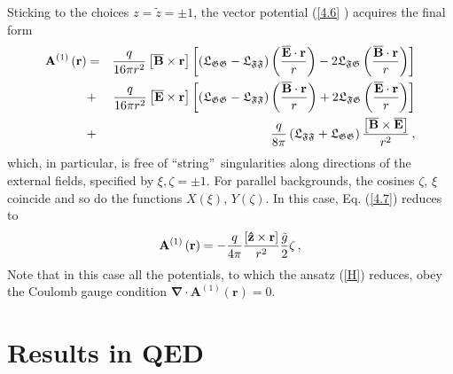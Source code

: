 \documentclass[12pt]{article}
\begin{document}
Sticking to the choices $z=\tilde{z}=\pm 1$, the vector potential (\ref{4.6}%
) acquires the final form%
\begin{eqnarray}
\mathbf{A}^{\left( 1\right) }\left( \mathbf{r}\right)  &=&\frac{q}{16\pi
r^{2}}\left[ \overline{\mathbf{B}}\times \mathbf{r}\right] \left[ \left( 
\mathfrak{L}_{\mathfrak{GG}}-\mathfrak{L}_{\mathfrak{FF}}\right) \left( 
\frac{\overline{\mathbf{E}}\cdot \mathbf{r}}{r}\right) -2\mathfrak{L}_{%
\mathfrak{FG}}\left( \frac{\overline{\mathbf{B}}\cdot \mathbf{r}}{r}\right) %
\right]   \notag \\
&+&\frac{q}{16\pi r^{2}}\left[ \overline{\mathbf{E}}\times \mathbf{r}\right] %
\left[ \left( \mathfrak{L}_{\mathfrak{GG}}-\mathfrak{L}_{\mathfrak{FF}%
}\right) \left( \frac{\overline{\mathbf{B}}\cdot \mathbf{r}}{r}\right) +2%
\mathfrak{L}_{\mathfrak{FG}}\left( \frac{\overline{\mathbf{E}}\cdot \mathbf{r%
}}{r}\right) \right]   \notag \\
&+&\frac{q}{8\pi }\left( \mathfrak{L}_{\mathfrak{FF}}+\mathfrak{L}_{%
\mathfrak{GG}}\right) \frac{\left[ \overline{\mathbf{B}}\times \overline{%
\mathbf{E}}\right] }{r^{2}}\,,  \label{4.7}
\end{eqnarray}%
which, in particular, is free of \textquotedblleft string\textquotedblright\
singularities along directions of the external fields, specified by $\xi
,\zeta =\pm 1$. For parallel backgrounds, the cosines $\zeta $, $\xi $
coincide and so do the functions $X\left( \xi \right) $, $Y\left( \zeta
\right) $. In this case, Eq. (\ref{4.7}) reduces to%
\begin{equation}
\mathbf{A}^{\left( 1\right) }\left( \mathbf{r}\right) =-\frac{q}{4\pi }\frac{%
\left[ \mathbf{\hat{z}}\times \mathbf{r}\right] }{r^{2}}\frac{\tilde{g}}{2}%
\zeta \,,  \label{4.12}
\end{equation}%
Note that in this case all the potentials, to which the ansatz (\ref{H})
reduces, obey the Coulomb gauge condition $\mathbf{\nabla }\cdot \mathbf{A}%
^{\left( 1\right) }\left( \mathbf{r}\right) =0$.

\section{Results in QED\label{S5}}
\end{document}
